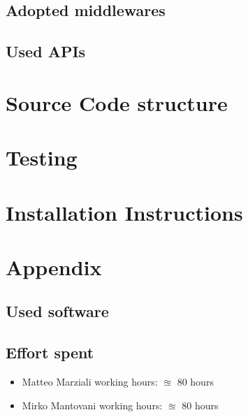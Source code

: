 \documentclass{article}
\begin{document}
\subsection{Adopted middlewares}
\subsection{Used APIs}

\clearpage
\section{Source Code structure}

\clearpage
\section{Testing}

\clearpage
\section{Installation Instructions}




\clearpage
\section{Appendix}

\subsection{Used software}


\subsection{Effort spent}
\begin{itemize}

\item Matteo Marziali working hours:  $\approxeq$ 80 hours

\item Mirko Mantovani working hours:  $\approxeq$ 80 hours



\end{itemize}
\end{document}
